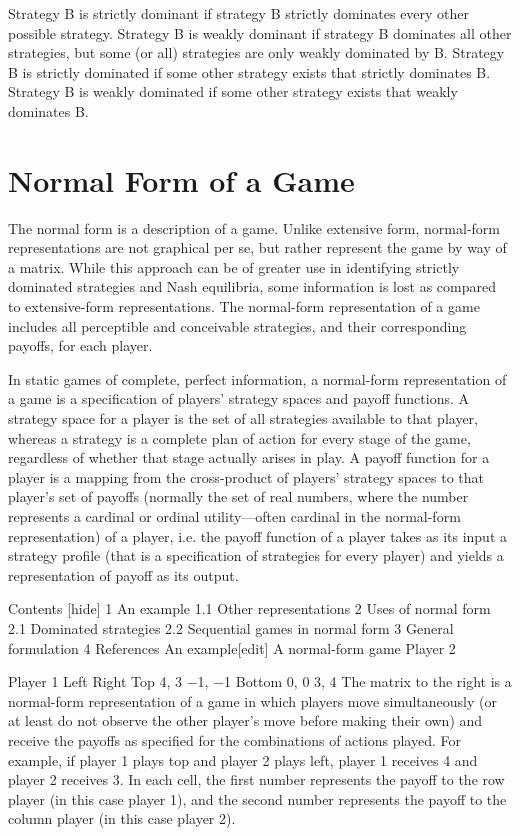 \documentclass[]{report}
\begin{document}
Strategy B is strictly dominant if strategy B strictly dominates every other possible strategy.
Strategy B is weakly dominant if strategy B dominates all other strategies, but some (or all) strategies are only weakly dominated by B.
Strategy B is strictly dominated if some other strategy exists that strictly dominates B.
Strategy B is weakly dominated if some other strategy exists that weakly dominates B.

\newpage

\section{Normal Form of a Game}
 
The normal form is a description of a game. Unlike extensive form, normal-form representations are not graphical per se, but rather represent the game by way of a matrix. While this approach can be of greater use in identifying strictly dominated strategies and Nash equilibria, some information is lost as compared to extensive-form representations. The normal-form representation of a game includes all perceptible and conceivable strategies, and their corresponding payoffs, for each player.

In static games of complete, perfect information, a normal-form representation of a game is a specification of players' strategy spaces and payoff functions. A strategy space for a player is the set of all strategies available to that player, whereas a strategy is a complete plan of action for every stage of the game, regardless of whether that stage actually arises in play. A payoff function for a player is a mapping from the cross-product of players' strategy spaces to that player's set of payoffs (normally the set of real numbers, where the number represents a cardinal or ordinal utility—often cardinal in the normal-form representation) of a player, i.e. the payoff function of a player takes as its input a strategy profile (that is a specification of strategies for every player) and yields a representation of payoff as its output.

Contents  [hide] 
1	An example
1.1	Other representations
2	Uses of normal form
2.1	Dominated strategies
2.2	Sequential games in normal form
3	General formulation
4	References
An example[edit]
A normal-form game
Player 2

Player 1
Left	Right
Top	4, 3	−1, −1
Bottom	0, 0	3, 4
The matrix to the right is a normal-form representation of a game in which players move simultaneously (or at least do not observe the other player's move before making their own) and receive the payoffs as specified for the combinations of actions played. For example, if player 1 plays top and player 2 plays left, player 1 receives 4 and player 2 receives 3. In each cell, the first number represents the payoff to the row player (in this case player 1), and the second number represents the payoff to the column player (in this case player 2).
\end{document}
